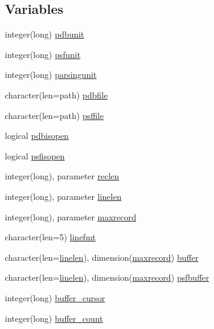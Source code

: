 \subsection*{Variables}
\begin{DoxyCompactItemize}
\item 
integer(long) \hyperlink{namespacemolreader_a5b0570862e5318937ea68a01966ed56f}{pdbunit}
\item 
integer(long) \hyperlink{namespacemolreader_a2b57a032db6161c98961f5e8109c3b90}{psfunit}
\item 
integer(long) \hyperlink{namespacemolreader_ac41219b2f68591f315dded4488483263}{parsingunit}
\item 
character(len=path) \hyperlink{namespacemolreader_aa372f060e4e581b1c14e2b46a65d2df4}{pdbfile}
\item 
character(len=path) \hyperlink{namespacemolreader_a48ac5c969e35417342bb66a57adec842}{psffile}
\item 
logical \hyperlink{namespacemolreader_ad7636360c8e0ecb526000567dd32d2d0}{pdbisopen}
\item 
logical \hyperlink{namespacemolreader_ae5cd9063d12a39b0e8266e184439c808}{psfisopen}
\item 
integer(long), parameter \hyperlink{namespacemolreader_a8f12be3272b946fd698c9fbaf2ba9d32}{reclen}
\item 
integer(long), parameter \hyperlink{namespacemolreader_acd493d996a1fcd0ed77937e925c9b7fe}{linelen}
\item 
integer(long), parameter \hyperlink{namespacemolreader_a7192fdfba4bcb0ee7504a9c6695c7106}{maxrecord}
\item 
character(len=5) \hyperlink{namespacemolreader_ac14650c697f68fd15530b93807e3f42f}{linefmt}
\item 
character(len=\hyperlink{namespacemolreader_acd493d996a1fcd0ed77937e925c9b7fe}{linelen}), dimension(\hyperlink{namespacemolreader_a7192fdfba4bcb0ee7504a9c6695c7106}{maxrecord}) \hyperlink{namespacemolreader_a06d78b69405420664607fb01b4d8e97a}{buffer}
\item 
character(len=\hyperlink{namespacemolreader_acd493d996a1fcd0ed77937e925c9b7fe}{linelen}), dimension(\hyperlink{namespacemolreader_a7192fdfba4bcb0ee7504a9c6695c7106}{maxrecord}) \hyperlink{namespacemolreader_aab845daa54f6803a37ceb91d7ad296a7}{psfbuffer}
\item 
integer(long) \hyperlink{namespacemolreader_a7b2e4f11efe55d80469efa3f7aeacbab}{buffer\+\_\+cursor}
\item 
integer(long) \hyperlink{namespacemolreader_ac7969154d301aab4a51cde89ec2f08ee}{buffer\+\_\+count}

\end{DoxyCompactItemize}

